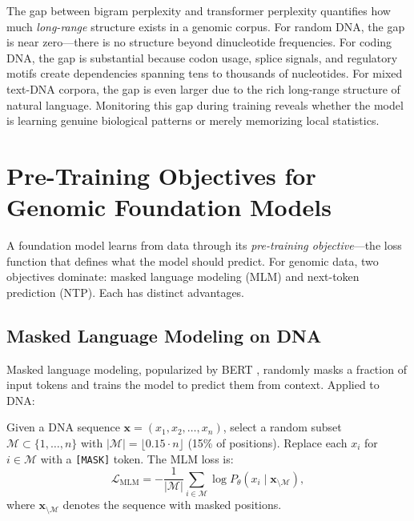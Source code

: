 \begin{keyinsight}
The gap between bigram perplexity and transformer perplexity quantifies how much \emph{long-range} structure exists in a genomic corpus. For random DNA, the gap is near zero---there is no structure beyond dinucleotide frequencies. For coding DNA, the gap is substantial because codon usage, splice signals, and regulatory motifs create dependencies spanning tens to thousands of nucleotides. For mixed text-DNA corpora, the gap is even larger due to the rich long-range structure of natural language. Monitoring this gap during training reveals whether the model is learning genuine biological patterns or merely memorizing local statistics.
\end{keyinsight}

\section{Pre-Training Objectives for Genomic Foundation Models}
\label{sec:pretraining-objectives}

A foundation model learns from data through its \emph{pre-training objective}---the loss function that defines what the model should predict. For genomic data, two objectives dominate: masked language modeling (MLM) and next-token prediction (NTP). Each has distinct advantages.

\subsection{Masked Language Modeling on DNA}

Masked language modeling, popularized by BERT \citep{devlin2019}, randomly masks a fraction of input tokens and trains the model to predict them from context. Applied to DNA:

\begin{dogmadef}
Given a DNA sequence $\mathbf{x} = (x_1, x_2, \ldots, x_n)$, select a random subset $\mathcal{M} \subset \{1, \ldots, n\}$ with $|\mathcal{M}| = \lfloor 0.15 \cdot n \rfloor$ (15\% of positions). Replace each $x_i$ for $i \in \mathcal{M}$ with a \texttt{[MASK]} token. The MLM loss is:
\begin{equation}
\mathcal{L}_{\mathrm{MLM}} = -\frac{1}{|\mathcal{M}|} \sum_{i \in \mathcal{M}} \log P_\theta(x_i \mid \mathbf{x}_{\setminus \mathcal{M}}),
\label{eq:mlm-dna}
\end{equation}
where $\mathbf{x}_{\setminus \mathcal{M}}$ denotes the sequence with masked positions.
\end{dogmadef}

